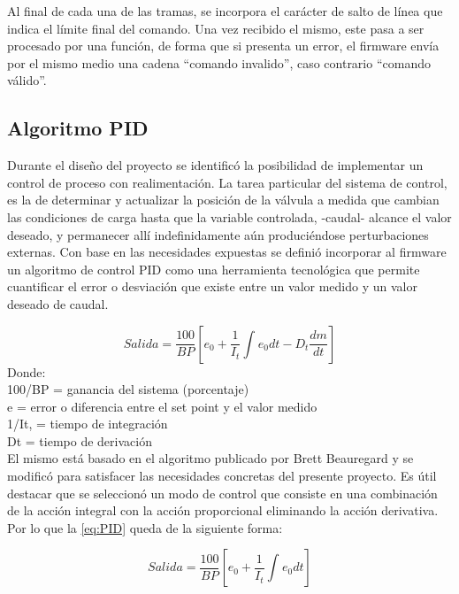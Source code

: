Al final de cada una de las tramas, se incorpora el carácter de salto de línea que indica el límite final del comando. Una vez recibido el mismo, este pasa a ser procesado por una función, de forma que si presenta un error, el firmware envía por el mismo medio una cadena “comando invalido”, caso contrario “comando válido”. 

\subsection{Algoritmo PID}
\label{subsec:Algoritmo PID}

Durante el diseño del proyecto se identificó la posibilidad de implementar un control de proceso con realimentación. La tarea particular del sistema de control, es la de determinar y actualizar la posición de la válvula a medida que cambian las condiciones de carga hasta que la variable controlada, -caudal- alcance el valor deseado, y permanecer allí indefinidamente aún produciéndose perturbaciones externas. Con base en las necesidades expuestas se definió incorporar al firmware un algoritmo de control PID como una herramienta tecnológica que permite cuantificar el error o desviación que existe entre un valor medido y un valor deseado de caudal. 

\begin{equation}
 \label{eq:PID}
Salida =  \frac{100}{BP} [e_{0}+ \frac{1}{I_{t}} \int_{}^{} e_{0} dt - D_{t} \frac{dm}{dt}]
\end{equation}
Donde:\\ 
100/BP = ganancia del sistema (porcentaje) \\
e = error o diferencia entre el set point y el valor medido \\
1/It, = tiempo de integración\\
Dt = tiempo de derivación\\

El mismo está basado en el algoritmo publicado por Brett Beauregard y se modificó para satisfacer las necesidades concretas del presente proyecto. Es útil destacar que se seleccionó un modo de control que consiste en una combinación de la acción integral con la acción proporcional eliminando la acción derivativa. Por lo que la \ref{eq:PID} queda de la siguiente forma:
   
\begin{equation}
 \label{eq:PID sin termino derivativo}
Salida =  \frac{100}{BP} [e_{0}+ \frac{1}{I_{t}} \int_{}^{} e_{0} dt]
\end{equation}

